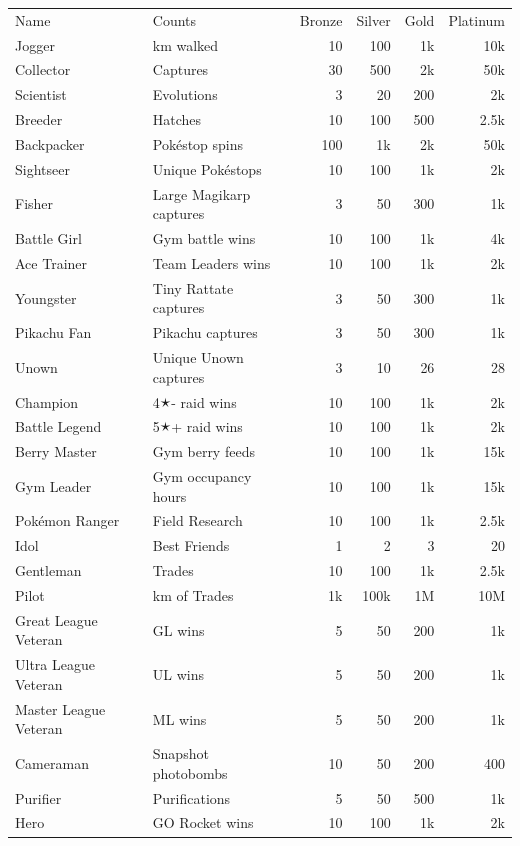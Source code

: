 \begin{table}[ht]
\centering
\begin{tabular}{lp{}rrrr}
Name & Counts & Bronze & Silver & Gold & Platinum\\
\Midrule
  Jogger & km walked & 10 & 100 & 1k & 10k\\
  Collector & Captures & 30 & 500 & 2k & 50k\\
  Scientist & Evolutions & 3 & 20 & 200 & 2k\\
  Breeder & Hatches & 10 & 100 & 500 & 2.5k\\
  Backpacker & Pokéstop spins & 100 & 1k & 2k & 50k\\
  Sightseer & Unique Pokéstops & 10 & 100 & 1k & 2k\\
  Fisher & Large Magikarp captures & 3 & 50 & 300 & 1k\\
  Battle Girl & Gym battle wins & 10 & 100 & 1k & 4k\\
  Ace Trainer & Team Leaders wins & 10 & 100 & 1k & 2k\\
  Youngster & Tiny Rattate captures & 3 & 50 & 300 & 1k\\
  Pikachu Fan & Pikachu captures & 3 & 50 & 300 & 1k\\
  Unown & Unique Unown captures & 3 & 10 & 26 & 28\\
  Champion & 4🟉- raid wins & 10 & 100 & 1k & 2k\\
  Battle Legend & 5🟉+ raid wins & 10 & 100 & 1k & 2k\\
  Berry Master & Gym berry feeds & 10 & 100 & 1k & 15k\\
  Gym Leader & Gym occupancy hours & 10 & 100 & 1k & 15k\\
  Pokémon Ranger & Field Research & 10 & 100 & 1k & 2.5k\\
  Idol & Best Friends & 1 & 2 & 3 & 20\\
  Gentleman & Trades & 10 & 100 & 1k & 2.5k\\
  Pilot & km of Trades & 1k & 100k & 1M & 10M\\
  Great League Veteran & GL wins & 5 & 50 & 200 & 1k\\
  Ultra League Veteran & UL wins & 5 & 50 & 200 & 1k\\
  Master League Veteran & ML wins & 5 & 50 & 200 & 1k\\
  Cameraman & Snapshot photobombs & 10 & 50 & 200 & 400\\
  Purifier & Purifications & 5 & 50 & 500 & 1k\\
  Hero & GO Rocket wins & 10 & 100 & 1k & 2k\\

\end{tabular}
\end{table}
